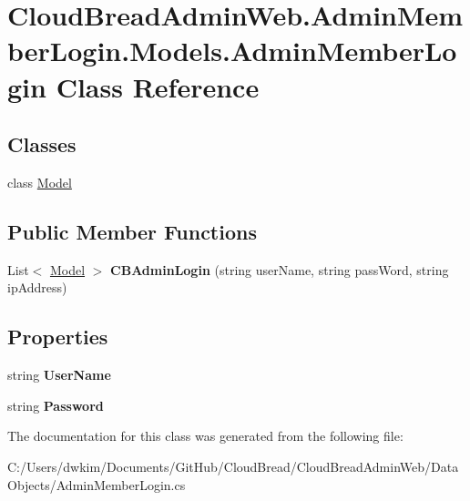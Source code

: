 \hypertarget{class_cloud_bread_admin_web_1_1_admin_member_login_1_1_models_1_1_admin_member_login}{}\section{Cloud\+Bread\+Admin\+Web.\+Admin\+Member\+Login.\+Models.\+Admin\+Member\+Login Class Reference}
\label{class_cloud_bread_admin_web_1_1_admin_member_login_1_1_models_1_1_admin_member_login}
\subsection*{Classes}
\begin{DoxyCompactItemize}
\item 
class \hyperlink{class_cloud_bread_admin_web_1_1_admin_member_login_1_1_models_1_1_admin_member_login_1_1_model}{Model}
\end{DoxyCompactItemize}
\subsection*{Public Member Functions}
\begin{DoxyCompactItemize}
\item 
List$<$ \hyperlink{class_cloud_bread_admin_web_1_1_admin_member_login_1_1_models_1_1_admin_member_login_1_1_model}{Model} $>$ {\bfseries C\+B\+Admin\+Login} (string user\+Name, string pass\+Word, string ip\+Address)\hypertarget{class_cloud_bread_admin_web_1_1_admin_member_login_1_1_models_1_1_admin_member_login_a63d8f50572b6c2bd5c6cd8514f3c696e}{}\label{class_cloud_bread_admin_web_1_1_admin_member_login_1_1_models_1_1_admin_member_login_a63d8f50572b6c2bd5c6cd8514f3c696e}

\end{DoxyCompactItemize}
\subsection*{Properties}
\begin{DoxyCompactItemize}
\item 
string {\bfseries User\+Name}\hypertarget{class_cloud_bread_admin_web_1_1_admin_member_login_1_1_models_1_1_admin_member_login_ad0d90ff54cd8ffc4270b7e093c3bddbd}{}\label{class_cloud_bread_admin_web_1_1_admin_member_login_1_1_models_1_1_admin_member_login_ad0d90ff54cd8ffc4270b7e093c3bddbd}

\item 
string {\bfseries Password}\hypertarget{class_cloud_bread_admin_web_1_1_admin_member_login_1_1_models_1_1_admin_member_login_a3604082f7c0c90e30d160d41797ca619}{}\label{class_cloud_bread_admin_web_1_1_admin_member_login_1_1_models_1_1_admin_member_login_a3604082f7c0c90e30d160d41797ca619}

\end{DoxyCompactItemize}


The documentation for this class was generated from the following file\+:\begin{DoxyCompactItemize}
\item 
C\+:/\+Users/dwkim/\+Documents/\+Git\+Hub/\+Cloud\+Bread/\+Cloud\+Bread\+Admin\+Web/\+Data\+Objects/Admin\+Member\+Login.\+cs\end{DoxyCompactItemize}
